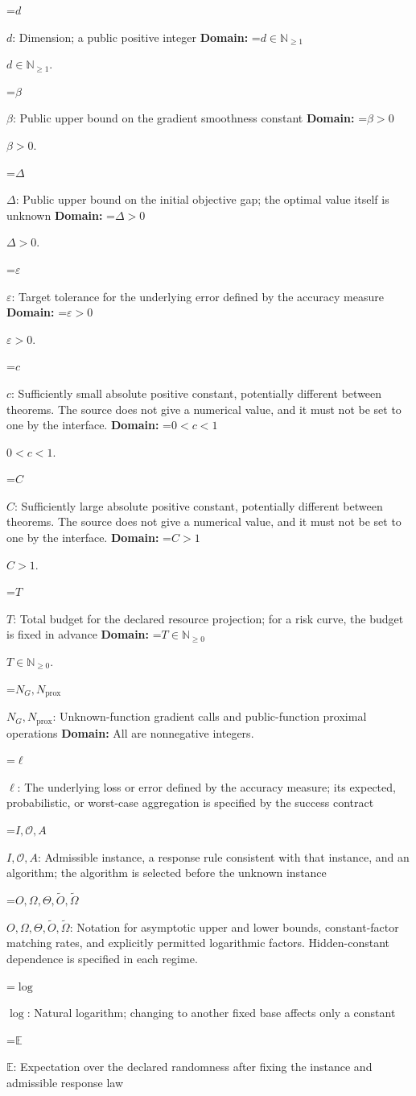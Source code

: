 \documentclass[10pt,a4paper]{article}
\newcommand{\AtlasMath}[1]{\par\begingroup\centering\setbox0=\hbox{$\displaystyle #1$}\ifdim\wd0>1.4\linewidth\typeout{ATLAS WIDE FORMULA: \the\wd0}\fi\ifdim\wd0>\linewidth\resizebox{\linewidth}{!}{\box0}\else\box0\fi\par\endgroup}
\newcommand{\AtlasInlineMath}[1]{\begingroup\setbox0=\hbox{$#1$}\ifdim\wd0>.4\linewidth\endgroup\AtlasMath{#1}\else\endgroup$#1$\fi}
\begin{document}
\AtlasInlineMath{d}: Dimension; a public positive integer \textbf{Domain:} \AtlasInlineMath{d\in\mathbb{N}_{\ge1}}.

\AtlasInlineMath{\beta}: Public upper bound on the gradient smoothness constant \textbf{Domain:} \AtlasInlineMath{\beta>0}.

\AtlasInlineMath{\Delta}: Public upper bound on the initial objective gap; the optimal value itself is unknown \textbf{Domain:} \AtlasInlineMath{\Delta>0}.

\AtlasInlineMath{\varepsilon}: Target tolerance for the underlying error defined by the accuracy measure \textbf{Domain:} \AtlasInlineMath{\varepsilon>0}.

\AtlasInlineMath{c}: Sufficiently small absolute positive constant, potentially different between theorems. The source does not give a numerical value, and it must not be set to one by the interface. \textbf{Domain:} \AtlasInlineMath{0<c<1}.

\AtlasInlineMath{C}: Sufficiently large absolute positive constant, potentially different between theorems. The source does not give a numerical value, and it must not be set to one by the interface. \textbf{Domain:} \AtlasInlineMath{C>1}.

\AtlasInlineMath{T}: Total budget for the declared resource projection; for a risk curve, the budget is fixed in advance \textbf{Domain:} \AtlasInlineMath{T\in\mathbb{N}_{\ge0}}.

\AtlasInlineMath{N_G,N_{\mathrm{prox}}}: Unknown-function gradient calls and public-function proximal operations \textbf{Domain:} All are nonnegative integers.

\AtlasInlineMath{\ell}: The underlying loss or error defined by the accuracy measure; its expected, probabilistic, or worst-case aggregation is specified by the success contract

\AtlasInlineMath{I,\mathcal{O},A}: Admissible instance, a response rule consistent with that instance, and an algorithm; the algorithm is selected before the unknown instance

\AtlasInlineMath{O,\Omega,\Theta,\widetilde{O},\widetilde\Omega}: Notation for asymptotic upper and lower bounds, constant-factor matching rates, and explicitly permitted logarithmic factors. Hidden-constant dependence is specified in each regime.

\AtlasInlineMath{\log}: Natural logarithm; changing to another fixed base affects only a constant

\AtlasInlineMath{\mathbb{E}}: Expectation over the declared randomness after fixing the instance and admissible response law
\end{document}
